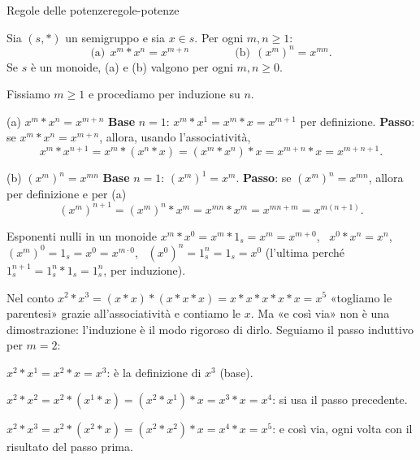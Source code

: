 \begin{concetto}
\begin{Teorema}{Regole delle potenze}{regole-potenze}
    \begin{prerequisiti}
    \end{prerequisiti}
    Sia $(s, *)$ un semigruppo e sia $x \in s$. Per ogni $m, n \geq 1$:
    \[ \text{(a)}\ \ x^m * x^n = x^{m + n} \qquad\qquad \text{(b)}\ \ (x^m)^n = x^{mn}. \]
    Se $s$ è un monoide, (a) e (b) valgono per ogni $m, n \geq 0$.
\end{Teorema}
\begin{dimostrazione}
    Fissiamo $m \geq 1$ e procediamo per induzione su $n$.
    \begin{caso}{(a) $x^m * x^n = x^{m + n}$}
        \textbf{Base} $n = 1$: $x^m * x^1 = x^m * x = x^{m + 1}$ per definizione. \textbf{Passo}: se $x^m * x^n = x^{m + n}$, allora, usando
        l'associatività,
        \[ x^m * x^{n + 1} = x^m * (x^n * x) = (x^m * x^n) * x = x^{m + n} * x = x^{m + n + 1}. \]
    \end{caso}
    \begin{caso}{(b) $(x^m)^n = x^{mn}$}
        \textbf{Base} $n = 1$: $(x^m)^1 = x^m$. \textbf{Passo}: se $(x^m)^n = x^{mn}$, allora per definizione e per (a)
        \[ (x^m)^{n + 1} = (x^m)^n * x^m = x^{mn} * x^m = x^{mn + m} = x^{m(n + 1)}. \]
    \end{caso}
    \begin{caso}{Esponenti nulli in un monoide}
        $x^m * x^0 = x^m * 1_s = x^m = x^{m + 0}$, \ $x^0 * x^n = x^n$, \ $(x^m)^0 = 1_s = x^0 = x^{m \cdot 0}$, \ $(x^0)^n = 1_s^n = 1_s = x^0$
        (l'ultima perché $1_s^{n + 1} = 1_s^n * 1_s = 1_s^n$, per induzione).
    \end{caso}
\end{dimostrazione}
\end{concetto}

\begin{spiegazione}
    Nel conto $x^2 * x^3 = (x * x) * (x * x * x) = x * x * x * x * x = x^5$ «togliamo le parentesi» grazie all'associatività e contiamo
    le $x$. Ma «e così via» non è una dimostrazione: l'induzione è il modo rigoroso di dirlo. Seguiamo il passo induttivo per $m = 2$:
    \begin{passi}
        \item $x^2 * x^1 = x^2 * x = x^3$: è la definizione di $x^3$ (base).
        \item $x^2 * x^2 = x^2 * (x^1 * x) = (x^2 * x^1) * x = x^3 * x = x^4$: si usa il passo precedente.
        \item $x^2 * x^3 = x^2 * (x^2 * x) = (x^2 * x^2) * x = x^4 * x = x^5$: e così via, ogni volta con il risultato del passo prima.
    \end{passi}
\end{spiegazione}


